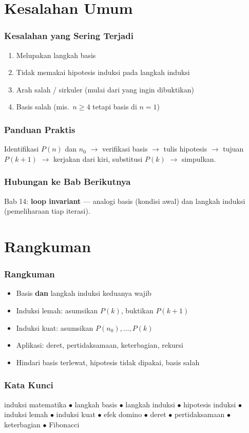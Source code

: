 \documentclass[handout]{beamer}
\theoremstyle{definition}
\theoremstyle{example}
\begin{document}
\section{Kesalahan Umum}

\begin{frame}
\frametitle{Kesalahan yang Sering Terjadi}
\begin{enumerate}
  \item Melupakan langkah basis
  \item Tidak memakai hipotesis induksi pada langkah induksi
  \item Arah salah / sirkuler (mulai dari yang ingin dibuktikan)
  \item Basis salah (mis.\ $n \geq 4$ tetapi basis di $n=1$)
\end{enumerate}
\end{frame}

\begin{frame}
\frametitle{Panduan Praktis}
Identifikasi $P(n)$ dan $n_0$ $\to$ verifikasi basis $\to$ tulis hipotesis $\to$ tujuan $P(k+1)$ $\to$ kerjakan dari kiri, substitusi $P(k)$ $\to$ simpulkan.
\end{frame}

\begin{frame}
\frametitle{Hubungan ke Bab Berikutnya}
Bab 14: \textbf{loop invariant} --- analogi basis (kondisi awal) dan langkah induksi (pemeliharaan tiap iterasi).
\end{frame}

\section{Rangkuman}

\begin{frame}
\frametitle{Rangkuman}
\begin{itemize}
  \item Basis \textbf{dan} langkah induksi keduanya wajib
  \item Induksi lemah: asumsikan $P(k)$, buktikan $P(k+1)$
  \item Induksi kuat: asumsikan $P(n_0),\ldots,P(k)$
  \item Aplikasi: deret, pertidaksamaan, keterbagian, rekursi
  \item Hindari basis terlewat, hipotesis tidak dipakai, basis salah
\end{itemize}
\end{frame}

\begin{frame}
\frametitle{Kata Kunci}
\begin{center}
\small
induksi matematika $\bullet$ langkah basis $\bullet$ langkah induksi $\bullet$ hipotesis induksi $\bullet$ induksi lemah $\bullet$ induksi kuat $\bullet$ efek domino $\bullet$ deret $\bullet$ pertidaksamaan $\bullet$ keterbagian $\bullet$ Fibonacci
\end{center}
\end{frame}
\end{document}
